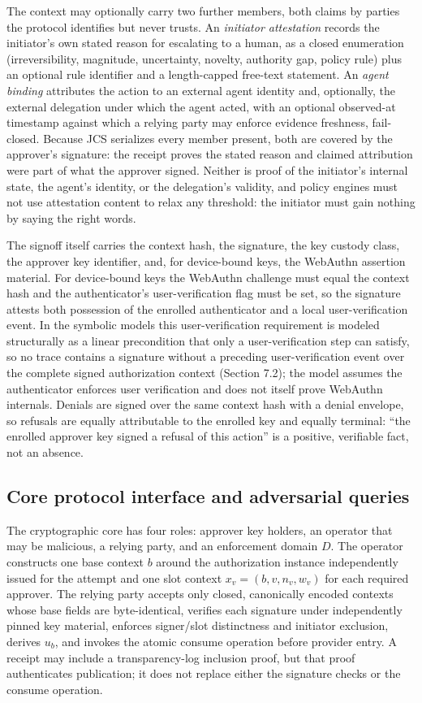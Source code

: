 \documentclass[11pt]{article}
\begin{document}
The context may optionally carry two further members, both claims by parties the
protocol identifies but never trusts. An \emph{initiator attestation} records the
initiator's own stated reason for escalating to a human, as a closed enumeration
(irreversibility, magnitude, uncertainty, novelty, authority gap, policy rule)
plus an optional rule identifier and a length-capped free-text statement. An
\emph{agent binding} attributes the action to an external agent identity and,
optionally, the external delegation under which the agent acted, with an optional
observed-at timestamp against which a relying party may enforce evidence
freshness, fail-closed. Because JCS serializes every member present, both are
covered by the approver's signature: the receipt proves the stated reason and
claimed attribution were part of what the approver signed. Neither is proof of the
initiator's internal state, the agent's identity, or the delegation's validity,
and policy engines must not use attestation content to relax any threshold: the
initiator must gain nothing by saying the right words.

The signoff itself carries the context hash, the signature, the key custody class,
the approver key identifier, and, for device-bound keys, the WebAuthn assertion
material. For device-bound keys the WebAuthn challenge must equal the context hash
and the authenticator's user-verification flag must be set, so the signature
attests both possession of the enrolled authenticator and a local user-verification
event. In the symbolic models this user-verification requirement is modeled
structurally as a linear precondition that only a user-verification step can
satisfy, so no trace contains a signature without a preceding user-verification
event over the complete signed authorization context (Section 7.2); the model assumes the
authenticator enforces user verification and does not itself prove WebAuthn
internals. Denials are signed over the same context hash with a denial envelope,
so refusals are equally attributable to the enrolled key and equally terminal:
``the enrolled approver key signed a refusal of this action'' is a positive,
verifiable fact, not an absence.

\subsection{Core protocol interface and adversarial queries}

The cryptographic core has four roles: approver key holders, an operator that
may be malicious, a relying party, and an enforcement domain $D$. The operator
constructs one base context $b$ around the authorization instance independently
issued for the attempt and one slot context $x_v=(b,v,n_v,w_v)$ for each required
approver. The relying party accepts only closed, canonically encoded
contexts whose base fields are byte-identical, verifies each signature under
independently pinned key material, enforces signer/slot distinctness and
initiator exclusion, derives $u_b$, and invokes the atomic consume operation
before provider entry. A receipt may include a transparency-log inclusion
proof, but that proof authenticates publication; it does not replace either the
signature checks or the consume operation.
\end{document}

